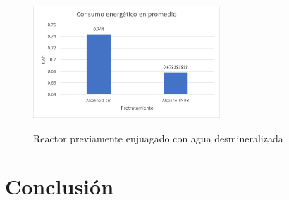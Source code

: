 \documentclass[12pt]{article}
\begin{document}
			
			
			
			
			\begin{figure} [H]
				\centering
				\includegraphics[width=7cm, height=5cm]{imagenes/grafico_alcalino}
				\caption{Reactor previamente enjuagado con agua desmineralizada}
				\label{grafica}
			\end{figure}
			
		\section{Conclusión}
			
			
		
		\newpage
	


	  	 
	   
	   
	   





		
\end{document}
